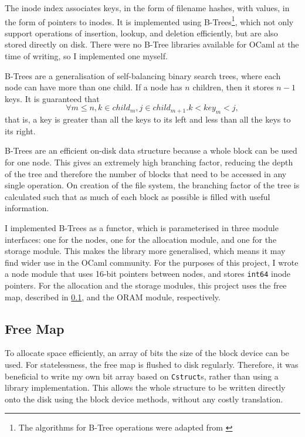 \documentclass[12pt,a4paper,twoside,openright]{report}
\begin{document}
The inode index associates keys, in the form of filename hashes, with values, in the form of pointers to inodes. It is implemented using B-Trees\footnote{The algorithms for B-Tree operations were adapted from \citet{CLRS09}}, which not only support operations of insertion, lookup, and deletion efficiently, but are also stored directly on disk. There were no B-Tree libraries available for OCaml at the time of writing, so I implemented one myself.

B-Trees are a generalisation of self-balancing binary search trees, where each node can have more than one child. If a node has $n$ children, then it stores $n-1$ keys. It is guaranteed that $$ \forall m \leq n, k \in child_m, j \in child_{m+1} . k < key_m < j,$$ that is, a key is greater than all the keys to its left and less than all the keys to its right.

B-Trees are an efficient on-disk data structure because a whole block can be used for one node. This gives an extremely high branching factor, reducing the depth of the tree and therefore the number of blocks that need to be accessed in any single operation. On creation of the file system, the branching factor of the tree is calculated such that as much of each block as possible is filled with useful information.

I implemented B-Trees as a functor, which is parameterised in three module interfaces: one for the nodes, one for the allocation module, and one for the storage module. This makes the library more generalised, which means it may find wider use in the OCaml community. For the purposes of this project, I wrote a node module that uses 16-bit pointers between nodes, and stores \texttt{int64} inode pointers. For the allocation and the storage modules, this project uses the free map, described in \cref{subsec:freemap}, and the ORAM module, respectively.

\subsection{Free Map}
\label{subsec:freemap}

To allocate space efficiently, an array of bits the size of the block device can be used. For statelessness, the free map is flushed to disk regularly. Therefore, it was beneficial to write my own bit array based on \texttt{Cstruct}s, rather than using a library implementation. This allows the whole structure to be written directly onto the disk using the block device methods, without any costly translation.
\end{document}
